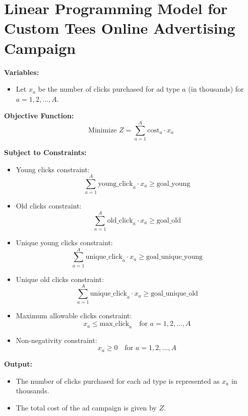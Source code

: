 \documentclass{article}
\begin{document}
\section*{Linear Programming Model for Custom Tees Online Advertising Campaign}

\textbf{Variables:}
\begin{itemize}
    \item Let \( x_a \) be the number of clicks purchased for ad type \( a \) (in thousands) for \( a = 1, 2, \ldots, A \).
\end{itemize}

\textbf{Objective Function:}
\[
\text{Minimize } Z = \sum_{a=1}^{A} \text{cost}_a \cdot x_a
\]

\textbf{Subject to Constraints:}

\begin{itemize}
    \item Young clicks constraint:
    \[
    \sum_{a=1}^{A} \text{young\_click}_{a} \cdot x_a \geq \text{goal\_young}
    \]
    
    \item Old clicks constraint:
    \[
    \sum_{a=1}^{A} \text{old\_click}_{a} \cdot x_a \geq \text{goal\_old}
    \]

    \item Unique young clicks constraint:
    \[
    \sum_{a=1}^{A} \text{unique\_click}_{a} \cdot x_a \geq \text{goal\_unique\_young}
    \]

    \item Unique old clicks constraint:
    \[
    \sum_{a=1}^{A} \text{unique\_click}_{a} \cdot x_a \geq \text{goal\_unique\_old}
    \]

    \item Maximum allowable clicks constraint:
    \[
    x_a \leq \text{max\_click}_{a} \quad \text{for } a = 1, 2, \ldots, A
    \]

    \item Non-negativity constraint:
    \[
    x_a \geq 0 \quad \text{for } a = 1, 2, \ldots, A
    \]
\end{itemize}

\textbf{Output:}
\begin{itemize}
    \item The number of clicks purchased for each ad type is represented as \( x_a \) in thousands.
    \item The total cost of the ad campaign is given by \( Z \).
\end{itemize}
\end{document}
